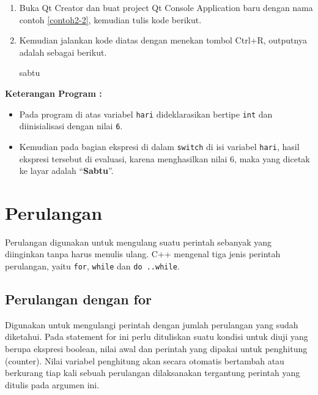 \begin{enumerate}

\item
  Buka Qt Creator dan buat project Qt Console Application baru dengan
  nama contoh \ref{contoh2-2}, kemudian tulis kode berikut.




\item
  Kemudian jalankan kode diatas dengan menekan tombol Ctrl+R, outputnya
  adalah sebagai berikut.

 \begin{lcverbatim}
sabtu
\end{lcverbatim}

\end{enumerate}



\textbf{Keterangan Program :}

\begin{itemize}

\item
  Pada program di atas variabel \texttt{hari} dideklarasikan bertipe
  \texttt{int} dan diinisialisasi dengan nilai \texttt{6}.
\item
  Kemudian pada bagian ekspresi di dalam \texttt{switch} di isi variabel
  \texttt{hari}, hasil ekspresi tersebut di evaluasi, karena
  menghasilkan nilai 6, maka yang dicetak ke layar adalah
  ``\textbf{Sabtu}''.
\end{itemize}

\section{Perulangan}\label{b.-perulangan}

Perulangan digunakan untuk mengulang suatu perintah sebanyak yang
diinginkan tanpa harus menulis ulang. C++ mengenal tiga jenis perintah
perulangan, yaitu \texttt{for}, \texttt{while} dan \texttt{do\ ..while}.

\subsection{Perulangan dengan for}\label{perulangan-dengan-for}

Digunakan untuk mengulangi perintah dengan jumlah perulangan yang sudah
diketahui. Pada statement for ini perlu dituliskan suatu kondisi untuk
diuji yang berupa ekspresi boolean, nilai awal dan perintah yang dipakai
untuk penghitung (counter). Nilai variabel penghitung akan secara
otomatis bertambah atau berkurang tiap kali sebuah perulangan
dilaksanakan tergantung perintah yang ditulis pada argumen ini.

